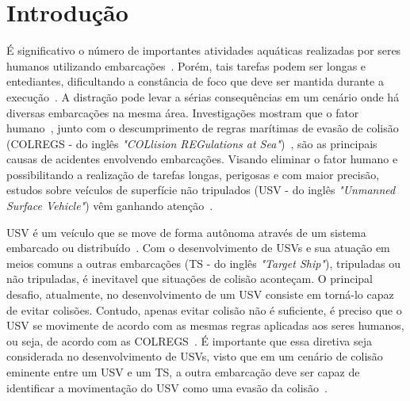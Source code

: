 


\chapter{Introdução}\label{chap1:intro}
    É significativo o número de importantes atividades aquáticas realizadas por seres humanos utilizando embarcações~\cite{LIU201671}. Porém, tais tarefas podem ser longas e entediantes, dificultando a constância de foco que deve ser mantida durante a execução~\cite{JURAK2020}. A distração pode levar a sérias consequências em um cenário onde há diversas embarcações na mesma área. Investigações mostram que o fator humano~\cite{HUANG2020451}, junto com o descumprimento de regras marítimas de evasão de colisão (COLREGS - do inglês \textit{"COLlision REGulations at Sea"})~\cite{JURAK2020}, são as principais causas de acidentes envolvendo embarcações.
    Visando eliminar o fator humano e possibilitando a realização de tarefas longas, perigosas e com maior precisão, estudos sobre veículos de superfície não tripulados (USV - do inglês \textit{"Unmanned Surface Vehicle"}) vêm ganhando atenção~\cite{LIU201671}.
    
    USV é um veículo que se move de forma autônoma através de um sistema embarcado ou distribuído~\cite{SONG2018351}. Com o desenvolvimento de USVs e sua atuação em meios comuns a outras embarcações (TS - do inglês \textit{"Target Ship"}), tripuladas ou não tripuladas, é inevitavel que situações de colisão aconteçam. O principal desafio, atualmente, no desenvolvimento de um USV consiste em torná-lo capaz de evitar colisões. Contudo, apenas evitar colisão não é suficiente, é preciso que o USV se movimente de acordo com as mesmas regras aplicadas aos seres humanos, ou seja, de acordo com as COLREGS~\cite{JURAK2020}. É importante que essa diretiva seja considerada no desenvolvimento de USVs, visto que em um cenário de colisão eminente entre um USV e um TS, a outra embarcação deve ser capaz de identificar a movimentação do USV como uma evasão da colisão~\cite{KUWATA2014110}.
    

